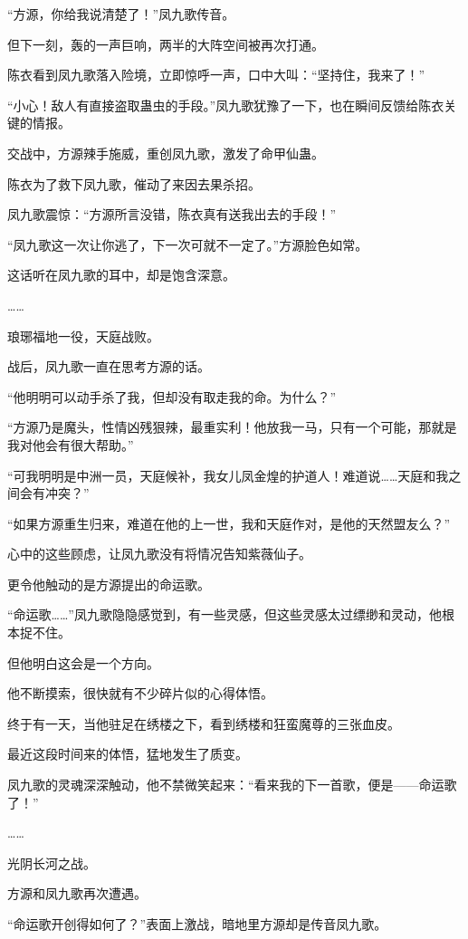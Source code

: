 \begin{this_body}
“方源，你给我说清楚了！”凤九歌传音。

但下一刻，轰的一声巨响，两半的大阵空间被再次打通。

陈衣看到凤九歌落入险境，立即惊呼一声，口中大叫：“坚持住，我来了！”

“小心！敌人有直接盗取蛊虫的手段。”凤九歌犹豫了一下，也在瞬间反馈给陈衣关键的情报。

交战中，方源辣手施威，重创凤九歌，激发了命甲仙蛊。

陈衣为了救下凤九歌，催动了来因去果杀招。

凤九歌震惊：“方源所言没错，陈衣真有送我出去的手段！”

“凤九歌这一次让你逃了，下一次可就不一定了。”方源脸色如常。

这话听在凤九歌的耳中，却是饱含深意。

……

琅琊福地一役，天庭战败。

战后，凤九歌一直在思考方源的话。

“他明明可以动手杀了我，但却没有取走我的命。为什么？”

“方源乃是魔头，性情凶残狠辣，最重实利！他放我一马，只有一个可能，那就是我对他会有很大帮助。”

“可我明明是中洲一员，天庭候补，我女儿凤金煌的护道人！难道说……天庭和我之间会有冲突？”

“如果方源重生归来，难道在他的上一世，我和天庭作对，是他的天然盟友么？”

心中的这些顾虑，让凤九歌没有将情况告知紫薇仙子。

更令他触动的是方源提出的命运歌。

“命运歌……”凤九歌隐隐感觉到，有一些灵感，但这些灵感太过缥缈和灵动，他根本捉不住。

但他明白这会是一个方向。

他不断摸索，很快就有不少碎片似的心得体悟。

终于有一天，当他驻足在绣楼之下，看到绣楼和狂蛮魔尊的三张血皮。

最近这段时间来的体悟，猛地发生了质变。

凤九歌的灵魂深深触动，他不禁微笑起来：“看来我的下一首歌，便是——命运歌了！”

……

光阴长河之战。

方源和凤九歌再次遭遇。

“命运歌开创得如何了？”表面上激战，暗地里方源却是传音凤九歌。


\end{this_body}
